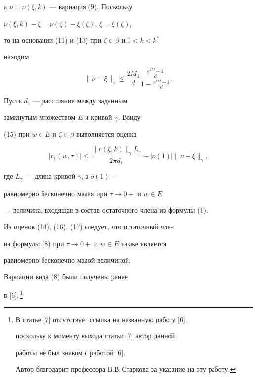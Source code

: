 \begin{pf}
а $\nu=\nu(\xi,k)$ --- вариация (9). Поскольку


$\nu(\xi,k)-\xi=\nu(\zeta)-\xi(\zeta)$, $\xi=\xi(\zeta)$,


то на основании (11) и (13) при $\zeta\in\beta$ и $0<k<k^{*}$ 


находим


\begin{equation}


\|\nu-\xi\|_{\gamma}\le


\frac{2M_{1}}{d}\frac{\frac{\mathrm e^{kM}-1}{d}}


{1-\frac{\mathrm e^{kM}-1}{d}}.


\end{equation}


Пусть $d_{1}$ --- расстояние между заданным


замкнутым множеством $E$ и кривой $\gamma$. Ввиду


(15) при $w\in E$ и $\zeta\in \beta$ выполняется оценка


\begin{equation}


|r_{1}(w,\tau)|\le\frac{\|r(\zeta,k)\|_{\gamma}


L_{\gamma}}{2\pi d_{1}}+


|o(1)|\|\nu-\xi\|_{\gamma},


\end{equation}


где $L_{\gamma}$ --- длина кривой $\gamma$, а $o(1)$ ---


равномерно бесконечно малая при $\tau\to 0+$ и $w\in E$


--- величина, входящая в состав остаточного члена из формулы (1).


Из оценок (14), (16), (17) следует, что остаточный член


из формулы (8) при $\tau\to 0+$ и $w\in E$ также является 


равномерно бесконечно малой величиной.


\end{pf}








Вариации вида (8) были получены ранее


в [6],\,\footnote{В статье [7] отсутствует ссылка на названную работу [6],


поскольку к моменту выхода статьи [7] автор данной


работы не был знаком с работой [6].


Автор благодарит профессора В.В.\,Старкова за указание на эту работу.}


